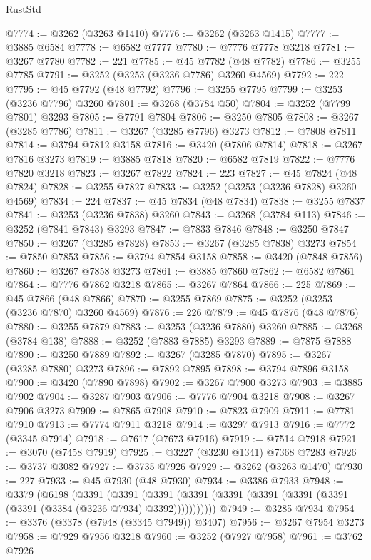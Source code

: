 \begin{lexlean}{RustStd}
\begin{coremodule}
@7774 := @3262 (@3263 @1410)
@7776 := @3262 (@3263 @1415)
@7777 := @3885 @6584
@7778 := @6582 @7777
@7780 := @7776 @7778 @3218
@7781 := @3267 @7780
@7782 := 221
@7785 := @45 @7782 (@48 @7782)
@7786 := @3255 @7785
@7791 := @3252 (@3253 (@3236 @7786) @3260 @4569)
@7792 := 222
@7795 := @45 @7792 (@48 @7792)
@7796 := @3255 @7795
@7799 := @3253 (@3236 @7796) @3260
@7801 := @3268 (@3784 @50)
@7804 := @3252 (@7799 @7801) @3293
@7805 := @7791 @7804
@7806 := @3250 @7805
@7808 := @3267 (@3285 @7786)
@7811 := @3267 (@3285 @7796) @3273
@7812 := @7808 @7811
@7814 := @3794 @7812 @3158
@7816 := @3420 (@7806 @7814)
@7818 := @3267 @7816 @3273
@7819 := @3885 @7818
@7820 := @6582 @7819
@7822 := @7776 @7820 @3218
@7823 := @3267 @7822
@7824 := 223
@7827 := @45 @7824 (@48 @7824)
@7828 := @3255 @7827
@7833 := @3252 (@3253 (@3236 @7828) @3260 @4569)
@7834 := 224
@7837 := @45 @7834 (@48 @7834)
@7838 := @3255 @7837
@7841 := @3253 (@3236 @7838) @3260
@7843 := @3268 (@3784 @113)
@7846 := @3252 (@7841 @7843) @3293
@7847 := @7833 @7846
@7848 := @3250 @7847
@7850 := @3267 (@3285 @7828)
@7853 := @3267 (@3285 @7838) @3273
@7854 := @7850 @7853
@7856 := @3794 @7854 @3158
@7858 := @3420 (@7848 @7856)
@7860 := @3267 @7858 @3273
@7861 := @3885 @7860
@7862 := @6582 @7861
@7864 := @7776 @7862 @3218
@7865 := @3267 @7864
@7866 := 225
@7869 := @45 @7866 (@48 @7866)
@7870 := @3255 @7869
@7875 := @3252 (@3253 (@3236 @7870) @3260 @4569)
@7876 := 226
@7879 := @45 @7876 (@48 @7876)
@7880 := @3255 @7879
@7883 := @3253 (@3236 @7880) @3260
@7885 := @3268 (@3784 @138)
@7888 := @3252 (@7883 @7885) @3293
@7889 := @7875 @7888
@7890 := @3250 @7889
@7892 := @3267 (@3285 @7870)
@7895 := @3267 (@3285 @7880) @3273
@7896 := @7892 @7895
@7898 := @3794 @7896 @3158
@7900 := @3420 (@7890 @7898)
@7902 := @3267 @7900 @3273
@7903 := @3885 @7902
@7904 := @3287 @7903
@7906 := @7776 @7904 @3218
@7908 := @3267 @7906 @3273
@7909 := @7865 @7908
@7910 := @7823 @7909
@7911 := @7781 @7910
@7913 := @7774 @7911 @3218
@7914 := @3297 @7913
@7916 := @7772 (@3345 @7914)
@7918 := @7617 (@7673 @7916)
@7919 := @7514 @7918
@7921 := @3070 (@7458 @7919)
@7925 := @3227 (@3230 @1341) @7368 @7283
@7926 := @3737 @3082
@7927 := @3735 @7926
@7929 := @3262 (@3263 @1470)
@7930 := 227
@7933 := @45 @7930 (@48 @7930)
@7934 := @3386 @7933
@7948 := @3379
    (@6198
      (@3391
        (@3391
          (@3391 (@3391 (@3391 (@3391 (@3391 (@3391 (@3391 (@3384 (@3236 @7934) @3392)))))))))))
@7949 := @3285 @7934
@7954 := @3376 (@3378 (@7948 (@3345 @7949)) @3407)
@7956 := @3267 @7954 @3273
@7958 := @7929 @7956 @3218
@7960 := @3252 (@7927 @7958)
@7961 := @3762 @7926

\end{coremodule}
\end{lexlean}
